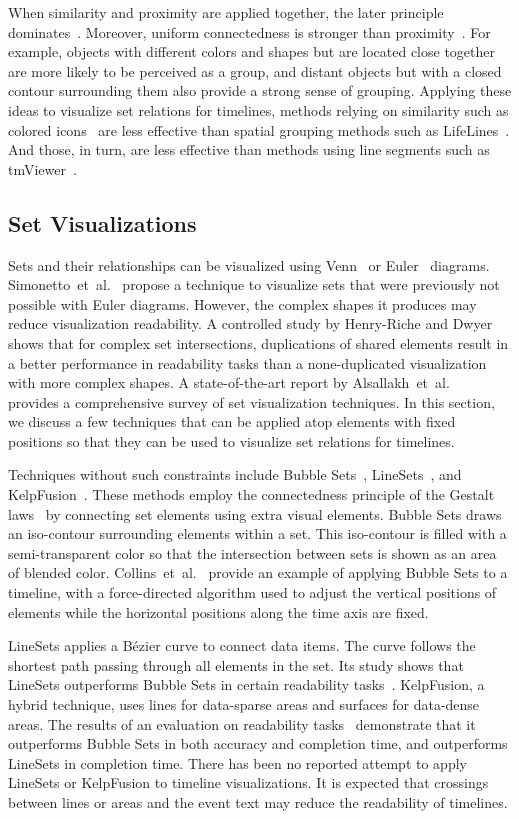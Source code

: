 When similarity and proximity are applied together, the later principle dominates~\cite{Ware2013}. Moreover, uniform connectedness is stronger than proximity~\cite{Palmer1994}. For example, objects with different colors and shapes but are located close together are more likely to be perceived as a group, and distant objects but with a closed contour surrounding them also provide a strong sense of grouping. Applying these ideas to visualize set relations for timelines, methods relying on similarity such as colored icons~\cite{Wang2008} are less effective than spatial grouping methods such as LifeLines~\cite{Plaisant1996}. And those, in turn, are less effective than methods using line segments such as tmViewer~\cite{Kumar1998}. 

\subsection{Set Visualizations}
Sets and their relationships can be visualized using Venn~\cite{Ruskey1997} or Euler~\cite{Rodgers2014} diagrams. Simonetto~et~al.~\cite{Simonetto2009} propose a technique to visualize sets that were previously not possible with Euler diagrams. However, the complex shapes it produces may reduce visualization readability. A controlled study by Henry-Riche and Dwyer~\cite{Riche2010} shows that for complex set intersections, duplications of shared elements result in a better performance in readability tasks than a none-duplicated visualization with more complex shapes. A state-of-the-art report by Alsallakh~et~al.~\cite{Alsallakh2014} provides a comprehensive survey of set visualization techniques. In this section, we discuss a few techniques that can be applied atop elements with fixed positions so that they can be used to visualize set relations for timelines. 

Techniques without such constraints include Bubble Sets~\cite{Collins2009a}, LineSets~\cite{Alper2011}, and KelpFusion~\cite{Meulemans2013}. These methods employ the connectedness principle of the Gestalt laws~\cite{Palmer1994} by connecting set elements using extra visual elements. Bubble Sets draws an iso-contour surrounding elements within a set. This iso-contour is filled with a semi-transparent color so that the intersection between sets is shown as an area of blended color. Collins~et~al.~\cite{Collins2009a} provide an example of applying Bubble Sets to a timeline, with a force-directed algorithm used to adjust the vertical positions of elements while the horizontal positions along the time axis are fixed. 

LineSets applies a B\'{e}zier curve to connect data items. The curve follows the shortest path passing through all elements in the set. Its study shows that LineSets outperforms Bubble Sets in certain readability tasks~\cite{Alper2011}. KelpFusion, a hybrid technique, uses lines for data-sparse areas and surfaces for data-dense areas. The results of an evaluation on readability tasks~\cite{Meulemans2013} demonstrate that it outperforms Bubble Sets in both accuracy and completion time, and outperforms LineSets in completion time. There has been no reported attempt to apply LineSets or KelpFusion to timeline visualizations. It is expected that crossings between lines or areas and the event text may reduce the readability of timelines.